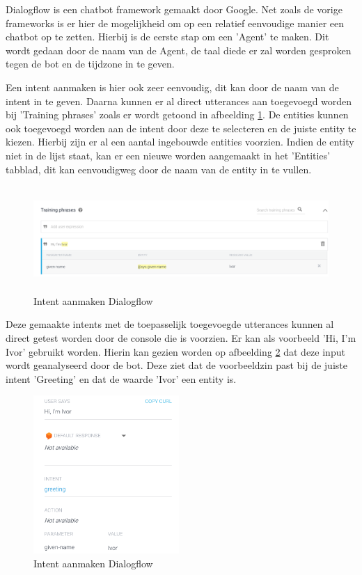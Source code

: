 Dialogflow is een chatbot framework gemaakt door Google. Net zoals de vorige frameworks is er hier de mogelijkheid om op een relatief eenvoudige manier een chatbot op te zetten. Hierbij is de eerste stap om een 'Agent' te maken. Dit wordt gedaan door de naam van de Agent, de taal diede er zal worden gesproken tegen de bot en de tijdzone in te geven.

Een intent aanmaken is hier ook zeer eenvoudig, dit kan door de naam van de intent in te geven. Daarna kunnen er al direct utterances aan toegevoegd worden bij 'Training phrases' zoals er wordt getoond in afbeelding \ref{fig:intentsdialogflow}. De entities kunnen ook toegevoegd worden aan de intent door deze te selecteren en de juiste entity te kiezen. Hierbij zijn er al een aantal ingebouwde entities voorzien. Indien de entity niet in de lijst staat, kan er een nieuwe worden aangemaakt in het 'Entities' tabblad, dit kan eenvoudigweg door de naam van de entity in te vullen.

\begin{figure}[h!]
	\centering
	\includegraphics[height=4cm]{img/dialogflow_intents.png}
	\caption{Intent aanmaken Dialogflow}
	\label{fig:intentsdialogflow}
\end{figure}

Deze gemaakte intents met de toepasselijk toegevoegde utterances kunnen al direct getest worden door de console die is voorzien. Er kan als voorbeeld 'Hi, I'm Ivor' gebruikt worden. Hierin kan gezien worden op afbeelding \ref{fig:testdialogflow} dat deze input wordt geanalyseerd door de bot. Deze ziet dat de voorbeeldzin past bij de juiste intent 'Greeting' en dat de waarde 'Ivor' een entity is.

\begin{figure}[h!]
	\centering
	\includegraphics[height=6cm]{img/dia_test.png}
	\caption{Intent aanmaken Dialogflow}
	\label{fig:testdialogflow}
\end{figure}

